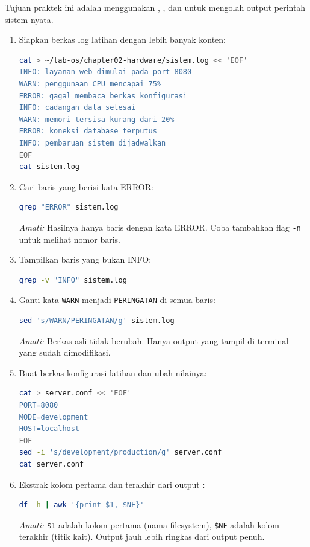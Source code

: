 Tujuan praktek ini adalah menggunakan , , dan  untuk mengolah output perintah sistem nyata.

\begin{enumerate}
    \item Siapkan berkas log latihan dengan lebih banyak konten:
\begin{lstlisting}[language=bash, caption={Membuat berkas log latihan}]
cat > ~/lab-os/chapter02-hardware/sistem.log << 'EOF'
INFO: layanan web dimulai pada port 8080
WARN: penggunaan CPU mencapai 75%
ERROR: gagal membaca berkas konfigurasi
INFO: cadangan data selesai
WARN: memori tersisa kurang dari 20%
ERROR: koneksi database terputus
INFO: pembaruan sistem dijadwalkan
EOF
cat sistem.log
\end{lstlisting}

    \item Cari baris yang berisi kata ERROR:
\begin{lstlisting}[language=bash, caption={Filter baris ERROR}]
grep "ERROR" sistem.log
\end{lstlisting}
    \textit{Amati:} Hasilnya hanya baris dengan kata ERROR. Coba tambahkan flag \texttt{-n} untuk melihat nomor baris.

    \item Tampilkan baris yang bukan INFO:
\begin{lstlisting}[language=bash, caption={Tampilkan baris selain INFO}]
grep -v "INFO" sistem.log
\end{lstlisting}

    \item Ganti kata \texttt{WARN} menjadi \texttt{PERINGATAN} di semua baris:
\begin{lstlisting}[language=bash, caption={Substitusi teks dengan sed}]
sed 's/WARN/PERINGATAN/g' sistem.log
\end{lstlisting}
    \textit{Amati:} Berkas asli tidak berubah. Hanya output yang tampil di terminal yang sudah dimodifikasi.

    \item Buat berkas konfigurasi latihan dan ubah nilainya:
\begin{lstlisting}[language=bash, caption={Edit konfigurasi dengan sed}]
cat > server.conf << 'EOF'
PORT=8080
MODE=development
HOST=localhost
EOF
sed -i 's/development/production/g' server.conf
cat server.conf
\end{lstlisting}

    \item Ekstrak kolom pertama dan terakhir dari output :
\begin{lstlisting}[language=bash, caption={Ekstrak kolom dengan awk}]
df -h | awk '{print $1, $NF}'
\end{lstlisting}
    \textit{Amati:} \texttt{\$1} adalah kolom pertama (nama filesystem), \texttt{\$NF} adalah kolom terakhir (titik kait). Output jauh lebih ringkas dari output  penuh.


\end{enumerate}
